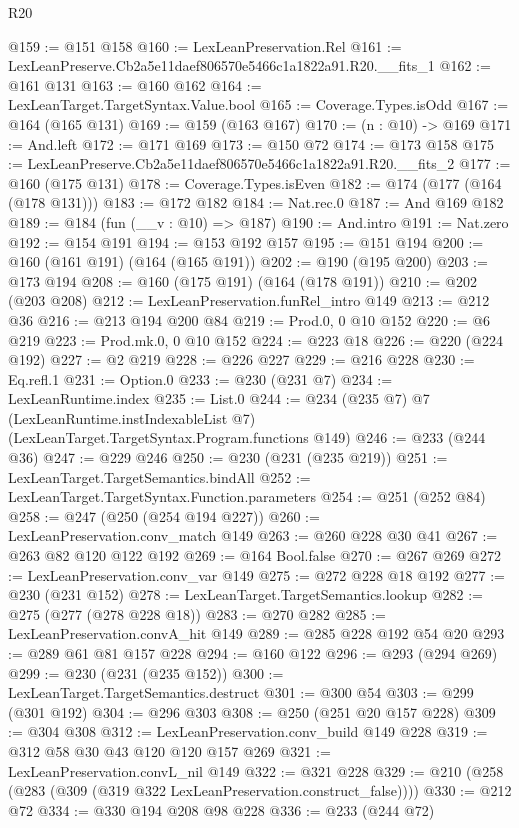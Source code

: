 \begin{lexlean}{R20}
\begin{coremodule}
@159 := @151 @158
@160 := LexLeanPreservation.Rel
@161 := LexLeanPreserve.Cb2a5e11daef806570e5466c1a1822a91.R20.__fits_1
@162 := @161 @131
@163 := @160 @162
@164 := LexLeanTarget.TargetSyntax.Value.bool
@165 := Coverage.Types.isOdd
@167 := @164 (@165 @131)
@169 := @159 (@163 @167)
@170 := (n : @10) -> @169
@171 := And.left
@172 := @171 @169
@173 := @150 @72
@174 := @173 @158
@175 := LexLeanPreserve.Cb2a5e11daef806570e5466c1a1822a91.R20.__fits_2
@177 := @160 (@175 @131)
@178 := Coverage.Types.isEven
@182 := @174 (@177 (@164 (@178 @131)))
@183 := @172 @182
@184 := Nat.rec.{0}
@187 := And @169 @182
@189 := @184 (fun (__v : @10) => @187)
@190 := And.intro
@191 := Nat.zero
@192 := @154 @191
@194 := @153 @192 @157
@195 := @151 @194
@200 := @160 (@161 @191) (@164 (@165 @191))
@202 := @190 (@195 @200)
@203 := @173 @194
@208 := @160 (@175 @191) (@164 (@178 @191))
@210 := @202 (@203 @208)
@212 := LexLeanPreservation.funRel_intro @149
@213 := @212 @36
@216 := @213 @194 @200 @84
@219 := Prod.{0, 0} @10 @152
@220 := @6 @219
@223 := Prod.mk.{0, 0} @10 @152
@224 := @223 @18
@226 := @220 (@224 @192)
@227 := @2 @219
@228 := @226 @227
@229 := @216 @228
@230 := Eq.refl.{1}
@231 := Option.{0}
@233 := @230 (@231 @7)
@234 := LexLeanRuntime.index
@235 := List.{0}
@244 := @234
    (@235 @7)
    @7
    (LexLeanRuntime.instIndexableList @7)
    (LexLeanTarget.TargetSyntax.Program.functions @149)
@246 := @233 (@244 @36)
@247 := @229 @246
@250 := @230 (@231 (@235 @219))
@251 := LexLeanTarget.TargetSemantics.bindAll
@252 := LexLeanTarget.TargetSyntax.Function.parameters
@254 := @251 (@252 @84)
@258 := @247 (@250 (@254 @194 @227))
@260 := LexLeanPreservation.conv_match @149
@263 := @260 @228 @30 @41
@267 := @263 @82 @120 @122 @192
@269 := @164 Bool.false
@270 := @267 @269
@272 := LexLeanPreservation.conv_var @149
@275 := @272 @228 @18 @192
@277 := @230 (@231 @152)
@278 := LexLeanTarget.TargetSemantics.lookup
@282 := @275 (@277 (@278 @228 @18))
@283 := @270 @282
@285 := LexLeanPreservation.convA_hit @149
@289 := @285 @228 @192 @54 @20
@293 := @289 @61 @81 @157 @228
@294 := @160 @122
@296 := @293 (@294 @269)
@299 := @230 (@231 (@235 @152))
@300 := LexLeanTarget.TargetSemantics.destruct
@301 := @300 @54
@303 := @299 (@301 @192)
@304 := @296 @303
@308 := @250 (@251 @20 @157 @228)
@309 := @304 @308
@312 := LexLeanPreservation.conv_build @149 @228
@319 := @312 @58 @30 @43 @120 @120 @157 @269
@321 := LexLeanPreservation.convL_nil @149
@322 := @321 @228
@329 := @210 (@258 (@283 (@309 (@319 @322 LexLeanPreservation.construct_false))))
@330 := @212 @72
@334 := @330 @194 @208 @98 @228
@336 := @233 (@244 @72)

\end{coremodule}
\end{lexlean}
